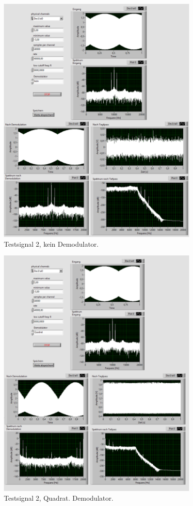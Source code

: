 \begin{figure}[H]
	\centering
	\includegraphics[width=0.9\textwidth]{pic/dam_2_keine.png}
	\caption{Testsignal 2, kein Demodulator.}
	\label{fig:a2}	
\end{figure} 

\newpage

\begin{figure}[H]
	\centering
	\includegraphics[width=0.9\textwidth]{pic/dam_2_quadrat.png}
	\caption{Testsignal 2, Quadrat. Demodulator.}
	\label{fig:a3}	
\end{figure}

